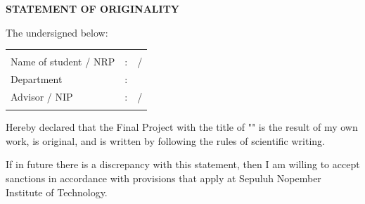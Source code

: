 \begin{center}
  \large
  \textbf{STATEMENT OF ORIGINALITY}
\end{center}

\thispagestyle{empty}

\vspace{2ex}


\noindent The undersigned below:

\noindent\begin{tabularx}{\textwidth}{l l X}
                        &   &                            \\
  Name of student / NRP & : & \name{} / \nrp{}           \\
  Department            & : & \engdepartment{}           \\
  Advisor / NIP         & : & \advisor{} / \advisornip{} \\
                        &   &                            \\
\end{tabularx}

Hereby declared that the Final Project with the title of "\engtatitle{}" is the result of my own work, is original, and is written by following the rules of scientific writing.

If in future there is a discrepancy with this statement, then I am willing to accept sanctions in accordance with provisions that apply at Sepuluh Nopember Institute of Technology.

\vspace{8ex}


